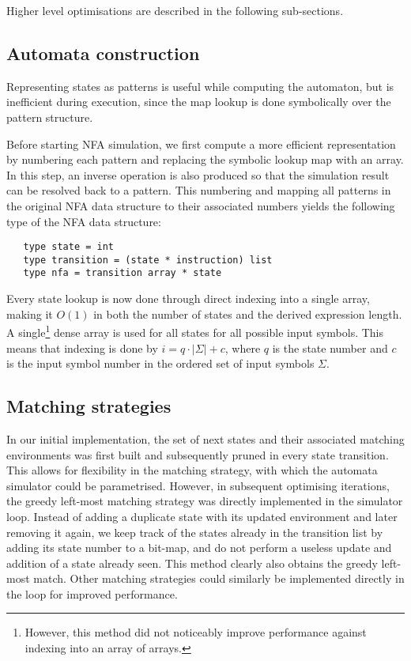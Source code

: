 Higher level optimisations are described in the following sub-sections.


\subsection{Automata construction}

Representing states as patterns is useful while computing the automaton, but is
inefficient during execution, since the map lookup is done symbolically over the
pattern structure.

Before starting NFA simulation, we first compute a more efficient representation
by numbering each pattern and replacing the symbolic lookup map with an array.
In this step, an inverse operation is also produced so that the simulation
result can be resolved back to a pattern. This numbering and mapping all
patterns in the original NFA data structure to their associated numbers yields
the following type of the NFA data structure:

\begin{lstlisting}
   type state = int
   type transition = (state * instruction) list
   type nfa = transition array * state
\end{lstlisting}

Every state lookup is now done through direct indexing into a single array,
making it $O(1)$ in both the number of states and the derived expression length.
A single\footnote{However, this method did not noticeably improve performance
against indexing into an array of arrays.} dense array is used for all states
for all possible input symbols. This means that indexing is done by $i = q \cdot
|\Sigma| + c$, where $q$ is the state number and $c$ is the input symbol number
in the ordered set of input symbols $\Sigma$.


\subsection{Matching strategies}

In our initial implementation, the set of next states and their associated
matching environments was first built and subsequently pruned in every state
transition. This allows for flexibility in the matching strategy, with which the
automata simulator could be parametrised. However, in subsequent optimising
iterations, the greedy left-most matching strategy was directly implemented in
the simulator loop. Instead of adding a duplicate state with its updated
environment and later removing it again, we keep track of the states already in
the transition list by adding its state number to a bit-map, and do not perform
a useless update and addition of a state already seen. This method clearly also
obtains the greedy left-most match. Other matching strategies could similarly be
implemented directly in the loop for improved performance.

